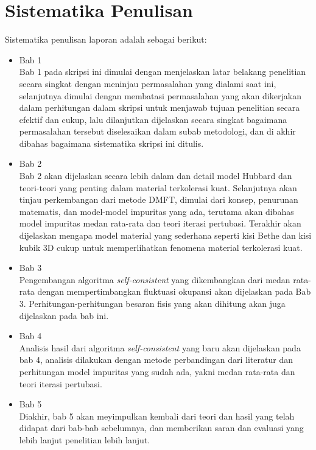 \section{Sistematika Penulisan}
Sistematika penulisan laporan adalah sebagai berikut:
\begin{itemize}
	\item Bab 1 \babSatu \\
	Bab 1 pada skripsi ini dimulai dengan menjelaskan latar belakang penelitian secara singkat dengan meninjau permasalahan yang dialami saat ini, selanjutnya dimulai dengan membatasi permasalahan yang akan dikerjakan dalam perhitungan dalam skripsi untuk menjawab tujuan penelitian secara efektif dan cukup, lalu dilanjutkan dijelaskan secara singkat bagaimana permasalahan tersebut diselesaikan dalam subab metodologi, dan di akhir dibahas bagaimana sistematika skripsi ini ditulis.
	\item Bab 2 \babDua \\
	Bab 2 akan dijelaskan secara lebih dalam dan detail model Hubbard dan teori-teori yang penting dalam material terkolerasi kuat. Selanjutnya akan tinjau perkembangan dari metode DMFT, dimulai dari konsep, penurunan matematis, dan model-model impuritas yang ada, terutama akan dibahas model impuritas medan rata-rata dan teori iterasi pertubasi. Terakhir akan dijelaskan mengapa model material yang sederhana seperti kisi Bethe dan kisi kubik 3D cukup untuk memperlihatkan fenomena material terkolerasi kuat.
	\item Bab 3 \babTiga \\
	Pengembangan algoritma \textit{self-consistent} yang dikembangkan dari medan rata-rata dengan mempertimbangkan fluktuasi okupansi akan dijelaskan pada Bab 3. Perhitungan-perhitungan besaran fisis yang akan dihitung akan juga dijelaskan pada bab ini.
	\item Bab 4 \babEmpat \\
	Analisis hasil dari algoritma \textit{self-consistent} yang baru akan dijelaskan pada bab 4, analisis dilakukan dengan metode perbandingan dari literatur dan perhitungan model impuritas yang sudah ada, yakni medan rata-rata dan teori iterasi pertubasi.
	\item Bab 5 \babLima \\
	Diakhir, bab 5 akan meyimpulkan kembali dari teori dan hasil yang telah didapat dari bab-bab sebelumnya, dan memberikan saran dan evaluasi yang lebih lanjut penelitian lebih lanjut.
\end{itemize}

